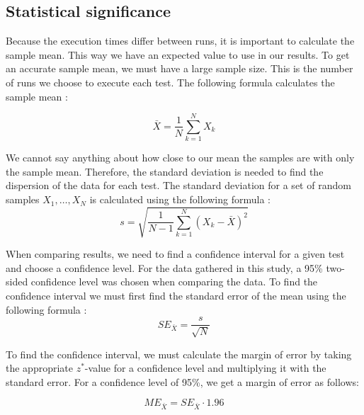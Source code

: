 
\subsection{Statistical significance}
Because the execution times differ between runs, it is important to calculate the sample mean. This way we have an expected value to use in our results. To get an accurate sample mean, we must have a large sample size. This is the number of runs we choose to execute each test. The following formula calculates the sample mean \cite[p.263]{olofsson2012probability}:

\begin{equation*}
    \bar{X} = \frac{1}{N} \sum\limits_{k = 1}^{N} X_k
\end{equation*}

We cannot say anything about how close to our mean the samples are with only the sample mean. Therefore, the standard deviation is needed to find the dispersion of the data for each test. The standard deviation for a set of random samples $X_1, \dots, X_N$ is calculated using the following formula \cite[p.~302]{olofsson2012probability}:
\begin{equation*}
    s = \sqrt{\frac{1}{N - 1} \sum\limits_{k = 1}^{N}\left(X_k - \bar{X}\right)^2}
\end{equation*}

When comparing results, we need to find a confidence interval for a given test and choose a confidence level. For the data gathered in this study, a 95\% two-sided confidence level was chosen when comparing the data. To find the confidence interval we must first find the standard error of the mean using the following formula \cite[p.~304]{olofsson2012probability}:
\begin{equation*}
    SE_{\bar{X}} = \frac{s}{\sqrt{N}}
\end{equation*}

To find the confidence interval, we must calculate the margin of error by taking the appropriate $z^*$-value for a confidence level and multiplying it with the standard error. For a confidence level of 95\%, we get a margin of error as follows:

\begin{equation*}
    ME_{\bar{X}} = SE_{\bar{X}} \cdot 1.96
\end{equation*}

